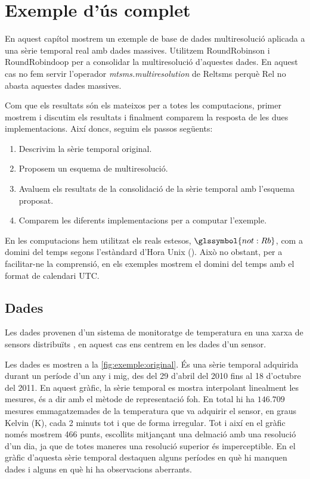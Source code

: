 \chapter{Exemple d'ús complet}
\label{sec:implementacions:exemple}

En aquest capítol mostrem un exemple de base de dades multiresolució
aplicada a una sèrie temporal real amb dades massives.  Utilitzem
RoundRobinson i RoundRobindoop per a consolidar la multiresolució
d'aquestes dades. En aquest cas no fem servir l'operador
\emph{mtsms.multiresolution} de Reltsms perquè Rel no abasta aquestes
dades massives.

Com que els resultats són els mateixos per a totes les computacions,
primer mostrem i discutim els resultats i finalment comparem la
resposta de les dues implementacions. Així doncs, seguim els passos
següents:

\begin{enumerate}
\item Descrivim la sèrie temporal original.
\item Proposem un esquema de multiresolució.
\item Avaluem els resultats de la consolidació de la sèrie temporal
  amb l'esquema proposat.
\item Comparem les diferents implementacions per a computar l'exemple.
\end{enumerate}


En les computacions hem utilitzat els reals estesos,
$\glssymbol{not:Rb}$, com a domini del temps segons l'estàndard d'Hora
Unix (). Això no obstant, per a facilitar-ne la
comprensió, en els exemples mostrem el domini del temps amb el format
de calendari \gls{UTC}.



\section{Dades}


Les dades provenen d'un sistema de monitoratge de temperatura en una
xarxa de sensors distribuïts \parencite{alippi10}, en aquest cas ens
centrem en les dades d'un sensor.

Les dades es mostren a la \autoref{fig:exemple:original}.  És una
sèrie temporal adquirida durant un període d'un any i mig, des del 29
d'abril del 2010 fins al 18 d'octubre del 2011. En aquest gràfic, la
sèrie temporal es mostra interpolant linealment les mesures, és a dir
amb el mètode de representació \gls{foh}.  
%
En total hi ha $146.709$
mesures emmagatzemades de la temperatura que va adquirir el sensor, en
graus Kelvin (K), cada 2 minuts tot i que de forma irregular.  Tot i
així en el gràfic només mostrem 466 punts, escollits mitjançant una
delmació amb una resolució d'un dia, ja que de totes maneres una
resolució superior és imperceptible.  En el gràfic d'aquesta sèrie
temporal destaquen alguns períodes en què hi manquen dades i alguns en
què hi ha observacions aberrants.


